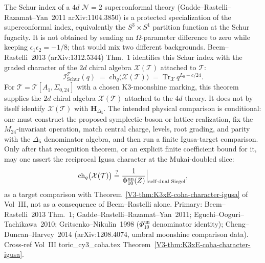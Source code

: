 \begin{remark}
\label{rem:feyn-nekrasov-schur-limit}
The Schur index of a $4d$ $\mathcal N = 2$ superconformal
theory (Gadde--Rastelli--Razamat--Yan~2011 arXiv:1104.3850)
is a protected specialization of the superconformal index, equivalently
the $S^3\times S^1$ partition function at the Schur fugacity.  It is
not obtained by sending an $\Omega$-parameter difference to zero while
keeping $\epsilon_1\epsilon_2=-1/8$; that would mix two different
backgrounds.  Beem--Rastelli~2013 (arXiv:1312.5344) Thm.~$1$
identifies this Schur index with the graded character of the
$2d$ chiral algebra $\mathcal X(\mathcal T)$ attached to
$\mathcal T$:
\[
 \mathcal I_{\mathrm{Schur}}^{\mathcal T}(q)
 \;=\; \mathrm{ch}_q\bigl(\mathcal X(\mathcal T)\bigr)
 \;=\; \mathrm{Tr}_{\mathcal X}\, q^{L_0 - c/24}.
\]
For $\mathcal T = \mathcal T[A_1, \Sigma_{0,24}]$ with a chosen
K3-moonshine marking, this theorem supplies the $2d$ chiral algebra
$\mathcal X(\mathcal T)$ attached to the $4d$ theory. It does not by itself
identify $\mathcal X(\mathcal T)$ with $\mathbf H_{\Delta_5}$. The intended
physical comparison is conditional: one must construct the proposed
symplectic-boson or lattice realization, fix the $M_{24}$-invariant operation,
match central charge, levels, root grading, and parity with the
$\Delta_5$ denominator algebra, and then run a finite Igusa-target comparison.
Only after that recognition theorem, or an explicit finite coefficient bound
for it, may one assert the reciprocal Igusa character at the Mukai-doubled
slice:
\[
 \mathrm{ch}_q\bigl(\mathcal X(\mathcal T)\bigr)
 \stackrel{?}{=}\frac{1}{\Phi_{10}^{\mathrm{un}}(Z)}
 \Bigl|_{\text{self-dual Siegel}},
\]
as a target comparison with Theorem~\ref{V3-thm:K3xE-coha-character-igusa}
of Vol~III, not as a consequence of Beem--Rastelli alone. Primary:
Beem--Rastelli~2013 Thm.~$1$;
Gadde--Rastelli--Razamat--Yan~2011; Eguchi--Ooguri--
Tachikawa~2010; Gritsenko--Nikulin~1998 ($\Phi_{10}^{\mathrm{un}}$
denominator identity); Cheng--Duncan--Harvey~2014
(arXiv:1208.4074, umbral moonshine comparison data). Cross-ref Vol~III
toric\_cy3\_coha.tex
Theorem~\ref{V3-thm:K3xE-coha-character-igusa}.
\end{remark}

